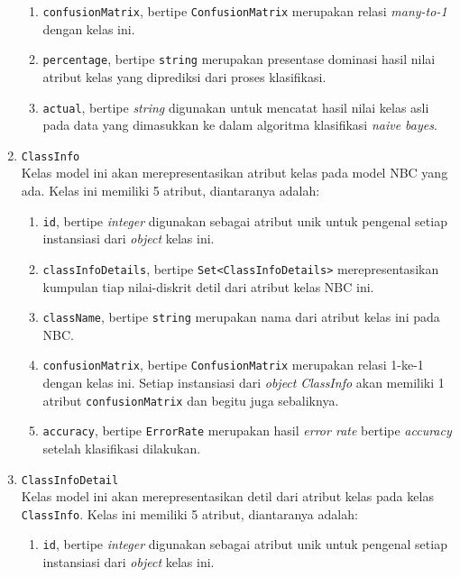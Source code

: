 \begin{enumerate}
\begin{enumerate}
		\item \texttt{confusionMatrix}, bertipe \texttt{ConfusionMatrix} merupakan relasi \textit{many-to-1} dengan kelas ini.

		\item \texttt{percentage}, bertipe \texttt{string} merupakan presentase dominasi hasil nilai atribut kelas yang diprediksi dari proses klasifikasi.
		

		\item \texttt{actual}, bertipe \textit{string} digunakan untuk mencatat hasil nilai kelas asli pada data yang dimasukkan ke dalam algoritma klasifikasi \textit{naive bayes}.

	\end{enumerate}


	\item \texttt{ClassInfo}\\
	Kelas model ini akan merepresentasikan atribut kelas pada model NBC yang ada. Kelas ini memiliki 5 atribut, diantaranya adalah:
	\begin{enumerate}
		\item \texttt{id}, bertipe \textit{integer} digunakan sebagai atribut unik untuk pengenal setiap instansiasi dari \textit{object} kelas ini.
		
		\item \texttt{classInfoDetails}, bertipe \texttt{Set<ClassInfoDetails>} merepresentasikan kumpulan tiap nilai-diskrit detil dari atribut kelas NBC ini.
		
		\item \texttt{className}, bertipe \texttt{string} merupakan nama dari atribut kelas ini pada NBC.
		
		\item \texttt{confusionMatrix}, bertipe \texttt{ConfusionMatrix} merupakan relasi 1-ke-1 dengan kelas ini. Setiap instansiasi dari \textit{object} \textit{ClassInfo} akan memiliki 1 atribut \texttt{confusionMatrix} dan begitu juga sebaliknya.
		
		\item \texttt{accuracy}, bertipe \texttt{ErrorRate} merupakan hasil \textit{error rate} bertipe \textit{accuracy} setelah klasifikasi dilakukan.
		
		
	\end{enumerate}

	\item \texttt{ClassInfoDetail}\\
	Kelas model ini akan merepresentasikan detil dari atribut kelas pada kelas \texttt{ClassInfo}. Kelas ini memiliki 5 atribut, diantaranya adalah:
	\begin{enumerate}
		\item \texttt{id}, bertipe \textit{integer} digunakan sebagai atribut unik untuk pengenal setiap instansiasi dari \textit{object} kelas ini.
		

\end{enumerate}
\end{enumerate}

